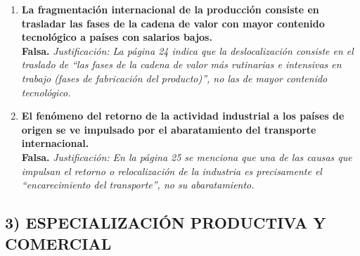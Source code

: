 \begin{enumerate}[label=\textbf{\arabic*.}]
    \item \textbf{La fragmentación internacional de la producción consiste en trasladar las fases de la cadena de valor con mayor contenido tecnológico a países con salarios bajos.} \\
    \textbf{Falsa.} \textit{Justificación: La página 24 indica que la deslocalización consiste en el traslado de ``las fases de la cadena de valor más rutinarias e intensivas en trabajo (fases de fabricación del producto)'', no las de mayor contenido tecnológico.}

    \item \textbf{El fenómeno del retorno de la actividad industrial a los países de origen se ve impulsado por el abaratamiento del transporte internacional.} \\
    \textbf{Falsa.} \textit{Justificación: En la página 25 se menciona que una de las causas que impulsan el retorno o relocalización de la industria es precisamente el ``encarecimiento del transporte'', no su abaratamiento.}

\end{enumerate}

\subsection*{3) ESPECIALIZACIÓN PRODUCTIVA Y COMERCIAL}

